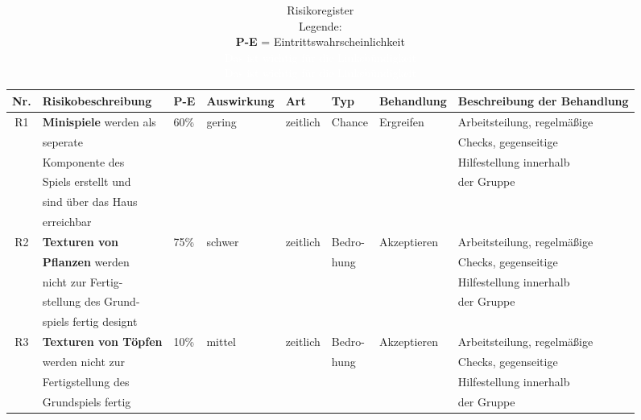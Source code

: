     
\begin{table}[H]
    \footnotesize
    \caption[Risikoregister]{Risikoregister \\ Legende: \\
            \textbf{P-E} = Eintrittswahrscheinlichkeit \\
            \tiny\textcolor{white}{Das ist wichtig für die Linksbündigkeit}\\
            \textcolor{white}{Das ist wichtig für die Linksbündigkeit}\\
            }
    \label{tab:risk}
    \footnotesize
    \begin{tabular}{|c|l|l|l|l|l|l|l|}
        \hline
        Nr. & Risikobeschreibung & P-E & Auswirkung & Art & Typ & Behandlung & Beschreibung der Behandlung \\[0.5ex]
        \hline \hline
        R1 & \textbf{Minispiele} werden als & 60\% & gering & zeitlich & Chance & Ergreifen & Arbeitsteilung, regelmäßige\\
        & seperate &  &  &  &  && Checks, gegenseitige  \\
        & Komponente des &  &  & & &  & Hilfestellung innerhalb \\
        & Spiels erstellt und &  &&  &  &  & der Gruppe \\
        & sind über das Haus &  &  &  & & &  \\
        & erreichbar &  &  &  &  &&  \\
        \hline
        R2 & \textbf{Texturen von} & 75\% & schwer & zeitlich & Bedro- & Akzeptieren & Arbeitsteilung, regelmäßige \\
        & \textbf{Pflanzen} werden &  &&  & hung &  & Checks, gegenseitige  \\
        & nicht zur Fertig- &  &  &  & & & Hilfestellung innerhalb \\
        & stellung des Grund- &  &  &  &&  & der Gruppe \\
        & spiels fertig designt &  &  &  & & &  \\
        \hline
        R3 & \textbf{Texturen von Töpfen} & 10\% & mittel & zeitlich & Bedro- & Akzeptieren & Arbeitsteilung, regelmäßige \\
        & werden nicht zur &  &  &  &hung&  & Checks, gegenseitige \\
        & Fertigstellung des &  &  & & &  & Hilfestellung innerhalb \\
        & Grundspiels fertig &  &  &  &&  & der Gruppe \\

\end{tabular}
\end{table}
